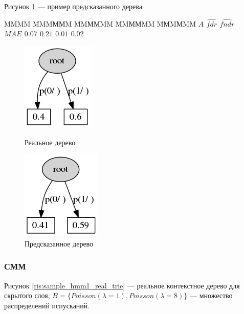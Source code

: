 \documentclass{matmex-diploma-custom}
\begin{document}
Рисунок \ref{ris:sample_mixture_predicted_trie} --- пример предсказанного дерева
\begin{tabbing}
MMMM \= MMMММM \= MMММMM \= MMММMM \= MМMМMM\kill
\bf{}  \> {\bf $\textit{A}$} \> {\bf \lambda} \> {\bf $\hat{\textit{fdr}}$} \> {\bf $\hat{\textit{fndr}}$}  \\ 
$\textit{MAE}$ \> $0.07$ \> $0.21$ \> $0.01$ \> $0.02$ \
\end{tabbing}
\begin{figure}[h!]\centering
\begin{minipage}[b]{0.49 \textwidth}
	\includegraphics[scale=0.57]{img/sample_mixture/real_trie_.png}
	\centering
	\caption{ Реальное дерево }
	\label{ris:sample_mixture_real_trie}
	
\end{minipage}
\hfil \hfil%
\begin{minipage}[b]{0.49 \textwidth}
	\includegraphics[scale=0.57]{img/sample_mixture/predicted_trie.png}
	\centering
	\caption{ Предсказанное дерево }
	\label{ris:sample_mixture_predicted_trie}
\end{minipage}
\end{figure}

\subsubsection{СММ}
Рисунок \ref{ris:sample_hmm1_real_trie} --- реальное контекстное дерево для скрытого слоя, 
$B = \{\textit{Poisson}(\lambda=1), \textit{Poisson}(\lambda=8)\}$ --- 
множество распределений испусканий.
\end{document}
